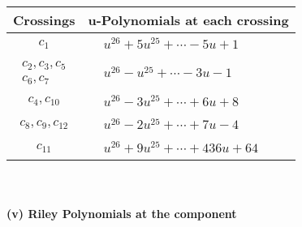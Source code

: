 \documentclass[1p]{elsarticle_modified}
\theoremstyle{definition}
\begin{document}
\begin{tabular}{m{50pt}|m{274pt}}
Crossings & \hspace{64pt}u-Polynomials at each crossing \\
\hline $$\begin{aligned}c_{1}\end{aligned}$$&$\begin{aligned}
&u^{26}+5 u^{25}+\cdots-5 u+1
\end{aligned}$\\
\hline $$\begin{aligned}c_{2},c_{3},c_{5}\\c_{6},c_{7}\end{aligned}$$&$\begin{aligned}
&u^{26}- u^{25}+\cdots-3 u-1
\end{aligned}$\\
\hline $$\begin{aligned}c_{4},c_{10}\end{aligned}$$&$\begin{aligned}
&u^{26}-3 u^{25}+\cdots+6 u+8
\end{aligned}$\\
\hline $$\begin{aligned}c_{8},c_{9},c_{12}\end{aligned}$$&$\begin{aligned}
&u^{26}-2 u^{25}+\cdots+7 u-4
\end{aligned}$\\
\hline $$\begin{aligned}c_{11}\end{aligned}$$&$\begin{aligned}
&u^{26}+9 u^{25}+\cdots+436 u+64
\end{aligned}$\\
\hline
\end{tabular}\\~\\
\newpage\renewcommand{\arraystretch}{1}
\flushleft \textbf{(v) Riley Polynomials at the component}\newline \\
\end{document}
